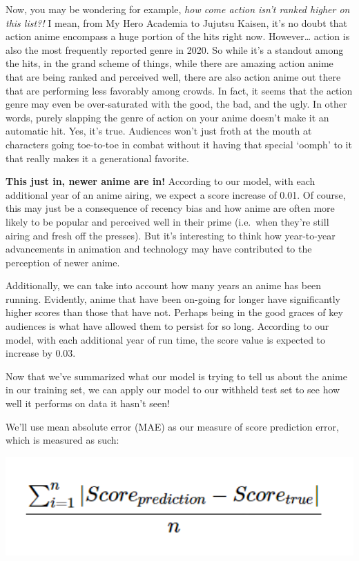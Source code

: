 \documentclass[
]{article}
\begin{document}
Now, you may be wondering for example,
\textit{how come action isn't ranked higher on this list?!} I mean, from
My Hero Academia to Jujutsu Kaisen, it's no doubt that action anime
encompass a huge portion of the hits right now. However\ldots{} action
is also the most frequently reported genre in 2020. So while it's a
standout among the hits, in the grand scheme of things, while there are
amazing action anime that are being ranked and perceived well, there are
also action anime out there that are performing less favorably among
crowds. In fact, it seems that the action genre may even be
over-saturated with the good, the bad, and the ugly. In other words,
purely slapping the genre of action on your anime doesn't make it an
automatic hit. Yes, it's true. Audiences won't just froth at the mouth
at characters going toe-to-toe in combat without it having that special
`oomph' to it that really makes it a generational favorite.

\textbf{This just in, newer anime are in!} According to our model, with
each additional year of an anime airing, we expect a score increase of
0.01. Of course, this may just be a consequence of recency bias and how
anime are often more likely to be popular and perceived well in their
prime (i.e.~when they're still airing and fresh off the presses). But
it's interesting to think how year-to-year advancements in animation and
technology may have contributed to the perception of newer anime.

Additionally, we can take into account how many years an anime has been
running. Evidently, anime that have been on-going for longer have
significantly higher scores than those that have not. Perhaps being in
the good graces of key audiences is what have allowed them to persist
for so long. According to our model, with each additional year of run
time, the score value is expected to increase by 0.03.

Now that we've summarized what our model is trying to tell us about the
anime in our training set, we can apply our model to our withheld test
set to see how well it performs on data it hasn't seen!

We'll use mean absolute error (MAE) as our measure of score prediction
error, which is measured as such:

\begin{center}\includegraphics[width=5.42in]{img/mae} \end{center}
\end{document}
